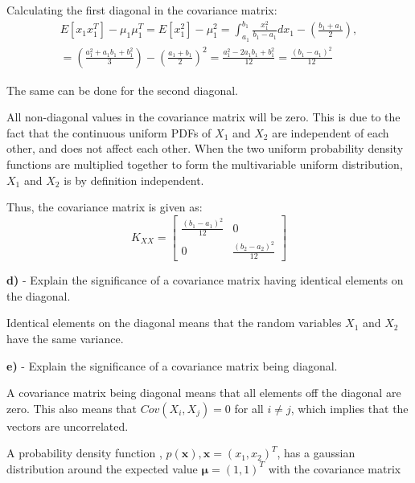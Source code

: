 \documentclass{homeworg}
\begin{document}
Calculating the first diagonal in the covariance matrix:
\begin{equation}
    \begin{aligned}
        E[x_1x_1^T]-\mu_1\mu_1^T = E[x_1^2] - \mu_1^2 =
        \int_{a_1}^{b_1}\frac{x_1^2}{b_1-a_1} dx_1 - \left(\frac{b_1+a_1}{2}\right), \\
        = \left(\frac{a_1^2+a_1b_1+b_1^2}{3}\right)-\left(\frac{a_1+b_1}{2}\right)^2
        =\frac{a_1^2-2a_1b_1+b_1^2}{12} = \frac{(b_1-a_1)^2}{12}
    \end{aligned}
\end{equation}

The same can be done for the second diagonal.

All non-diagonal values in the covariance matrix will be zero. This is due to the fact 
that the continuous uniform PDFs of $X_1$ and $X_2$ are independent of each other, 
and does not affect each other. When the two uniform probability density functions are multiplied 
together to form the multivariable uniform distribution, $X_1$ and $X_2$ is by definition independent.

Thus, the covariance matrix is given as:
\begin{equation}
    K_{XX} = 
    \begin{bmatrix}
        \frac{(b_1-a_1)^2}{12} & 0
        \\ 
        0 & \frac{(b_2-a_2)^2}{12}
    \end{bmatrix}
\end{equation}


\bigskip
\textbf{d)} - Explain the significance of a covariance matrix having identical elements
on the diagonal.
\smallskip

Identical elements on the diagonal means that the random variables $X_1$ and $X_2$ have the same variance.


\bigskip
\textbf{e)} - Explain the significance of a covariance matrix being diagonal.
\smallskip

A covariance matrix being diagonal means that all elements off the diagonal are zero.
This also means that $Cov(X_i, X_j) = 0$ for all $i \neq j$, 
which implies that the vectors are uncorrelated.

\newpage

\problem

A probability density function , $p(\bm{x}), \bm{x} = (x_1, x_2)^T$, has a gaussian distribution around the expected value $\bm{\mu} = (1, 1)^T$ with the covariance matrix
\end{document}
